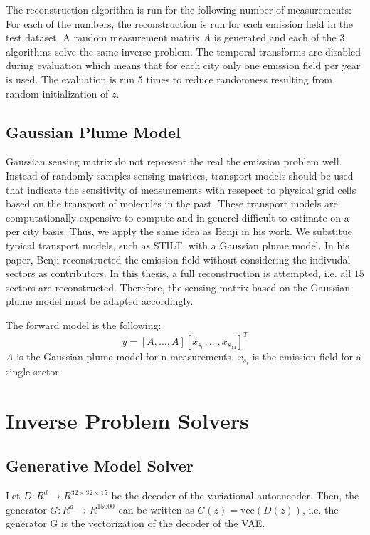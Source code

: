 The reconstruction algorithm is run for the following number of measurements:
For each of the numbers, the reconstruction is run for each emission field in the test dataset.
A random measurement matrix $A$ is generated and each of the $3$ algorithms solve the same inverse problem.
The temporal transforms are disabled during evaluation which means that for each city only one emission field per year is used.
The evaluation is run 5 times to reduce randomness resulting from random initialization of $z$.

\subsection{Gaussian Plume Model}
Gaussian sensing matrix do not represent the real the emission problem well.
Instead of randomly samples sensing matrices, transport models should be used that indicate the sensitivity of measurements with resepect to physical grid cells based on the transport of molecules in the past.
These transport models are computationally expensive to compute and in generel difficult to estimate on a per city basis.
Thus, we apply the same idea as Benji in his work.
We substitue typical transport models, such as STILT, with a Gaussian plume model.
In his paper, Benji reconstructed the emission field without considering the indivudal sectors as contributors.
In this thesis, a full reconstruction is attempted, i.e. all $15$ sectors are reconstructed.
Therefore, the sensing matrix based on the Gaussian plume model must be adapted accordingly.

The forward model is the following:
\begin{equation}
    y = [A, \dots, A] [x_{s_0}, \dots, x_{s_{14}}]^T
\end{equation}
$A$ is the Gaussian plume model for n measurements.
$x_{s_i}$ is the emission field for a single sector.

\section{Inverse Problem Solvers}

\subsection{Generative Model Solver}
Let $D: R^d \rightarrow R^{32 \times 32 \times 15}$ be the decoder of the variational autoencoder.
Then, the generator $G: R^d \rightarrow R^{15000}$ can be written as $G(z) = \text{vec}(D(z))$, i.e. the generator G is the vectorization of the decoder of the VAE.

